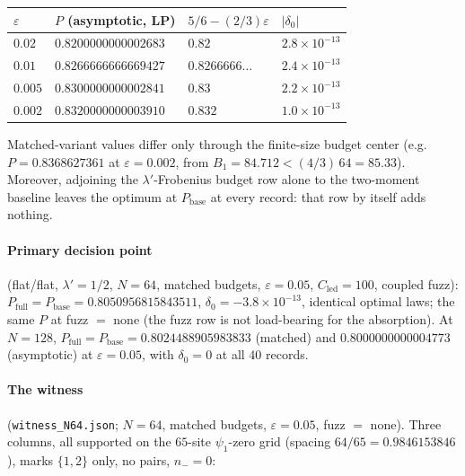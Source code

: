 \documentclass[11pt]{article}
\theoremstyle{plain}
\theoremstyle{definition}
\theoremstyle{remark}
\newcommand{\Cled}{C_{\mathrm{led}}}
\begin{document}
\begin{table}[h]
\centering
\begin{tabular}{@{}llll@{}}
\toprule
$\varepsilon$ & $P$ (asymptotic, LP) & $5/6 - (2/3)\varepsilon$ &
$|\delta_0|$ \\
\midrule
$0.02$ & $0.8200000000002683$ & $0.82$ & $2.8 \times 10^{-13}$ \\
$0.01$ & $0.8266666666669427$ & $0.8266666\ldots$ & $2.4 \times 10^{-13}$ \\
$0.005$ & $0.8300000000002841$ & $0.83$ & $2.2 \times 10^{-13}$ \\
$0.002$ & $0.8320000000003910$ & $0.832$ & $1.0 \times 10^{-13}$ \\
\bottomrule
\end{tabular}
\end{table}

Matched-variant values differ only through the finite-size budget center (e.g.\
$P = 0.8368627361$ at $\varepsilon = 0.002$, from
$B_1 = 84.712 < (4/3)\,64 = 85.33$). Moreover, adjoining the
$\lambda'$-Frobenius budget row alone to the two-moment baseline leaves the
optimum at $P_{\mathrm{base}}$ at every record: that row by itself adds
nothing.

\paragraph{Primary decision point}
(flat/flat, $\lambda' = 1/2$, $N = 64$, matched budgets, $\varepsilon = 0.05$,
$\Cled = 100$, coupled fuzz):
$P_{\mathrm{full}} = P_{\mathrm{base}} = 0.8050956815843511$,
$\delta_0 = -3.8 \times 10^{-13}$, identical optimal laws; the same $P$ at
fuzz $=$ none (the fuzz row is not load-bearing for the absorption). At
$N = 128$, $P_{\mathrm{full}} = P_{\mathrm{base}} = 0.8024488905983833$ (matched)
and $0.8000000000004773$ (asymptotic) at $\varepsilon = 0.05$, with
$\delta_0 = 0$ at all $40$ records.

\paragraph{The witness}
(\texttt{witness\_N64.json}; $N = 64$, matched budgets, $\varepsilon = 0.05$,
fuzz $=$ none). Three columns, all supported on the $65$-site $\psi_1$-zero grid
(spacing $64/65 = 0.9846153846$), marks $\{1, 2\}$ only, no pairs, $n_- = 0$:
\end{document}
